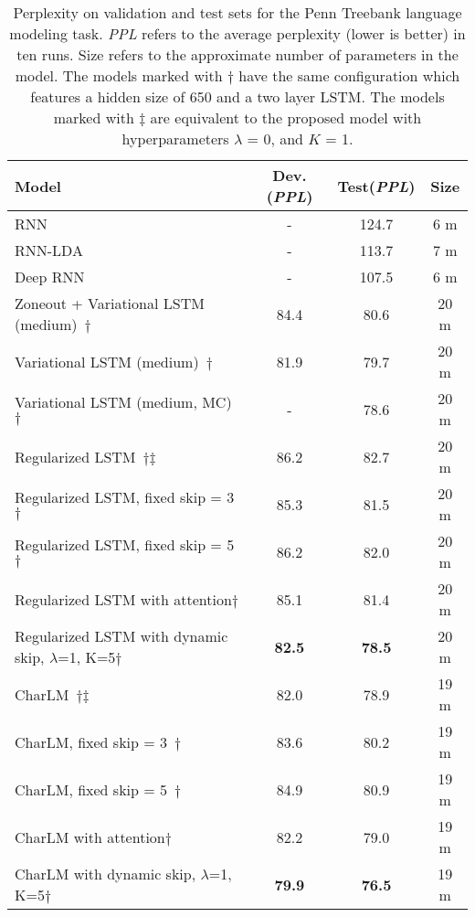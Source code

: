 \documentclass[letterpaper]{article} \usepackage{aaai19}  \usepackage{times}  \usepackage{helvet}  \usepackage{courier}  \usepackage{url}  \usepackage{graphicx}  \usepackage{amsmath}
\begin{document}
\begin{table*}[t]
\centering
\begin{tabular}{l|c|c|c}
\hline
  \textbf{Model}  & \textbf{Dev.}(\textit{PPL}) & \textbf{Test}(\textit{PPL}) & \textbf{Size}\\
  \hline
  RNN~\cite{mikolov2012context} & - & 124.7 & 6 m\\
  RNN-LDA~\cite{mikolov2012context} & - & 113.7 & 7 m\\
  Deep RNN~\cite{pascanu2013construct} & - & 107.5 & 6 m\\
  Zoneout + Variational LSTM (medium)~\cite{merity2016pointer}$\dagger$ & 84.4 & 80.6 & 20 m\\
  Variational LSTM (medium)~\cite{gal2016theoretically}$\dagger$ & 81.9 & 79.7 & 20 m\\
  Variational LSTM (medium, MC)~\cite{gal2016theoretically}$\dagger$ & - & 78.6 & 20 m\\
  \hline
  \hline
  Regularized LSTM~\cite{zaremba2014recurrent}$\dagger$$\ddagger$ & 86.2 & 82.7 & 20 m \\
  Regularized LSTM, fixed skip = 3~\cite{zhang2016architectural}$\dagger$ & 85.3 & 81.5 & 20 m \\
  Regularized LSTM, fixed skip = 5~\cite{zhang2016architectural}$\dagger$ & 86.2 & 82.0 & 20 m \\
  Regularized LSTM with attention$\dagger$ & 85.1 & 81.4 & 20 m \\
Regularized LSTM with dynamic skip, $\lambda$=1, K=5$\dagger$ & \textbf{82.5} & \textbf{78.5} & 20 m \\
  \hline
  \hline
  CharLM~\cite{kim2016character}$\dagger$$\ddagger$ & 82.0 & 78.9 & 19 m \\
  CharLM, fixed skip = 3~\cite{zhang2016architectural}$\dagger$ & 83.6 & 80.2 & 19 m \\
  CharLM, fixed skip = 5~\cite{zhang2016architectural}$\dagger$ & 84.9 & 80.9& 19 m \\
  CharLM with attention$\dagger$ & 82.2 & 79.0 & 19 m \\
CharLM with dynamic skip, $\lambda$=1, K=5$\dagger$ & \textbf{79.9} & \textbf{76.5} & 19 m \\
  \hline
\end{tabular}
\caption{Perplexity on validation and test sets for the Penn Treebank language modeling task. \textit{PPL} refers to the average perplexity (lower is better) in ten runs. Size refers to the approximate number of parameters in the model. The models marked with $\dagger$ have the same configuration which features a hidden size of 650 and a two layer LSTM. The models marked with $\ddagger$ are equivalent to the proposed model with hyperparameters $\lambda$ = 0, and $K$ = 1.}
  \label{tab:LM}
\end{table*}
\end{document}
